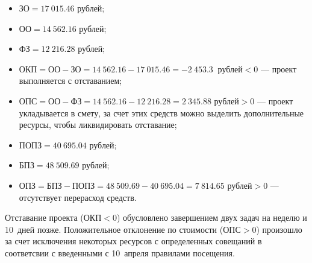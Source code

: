 \begin{itemize}
    \item $\text{ЗО} = 17~015.46$ рублей;
    \item $\text{ОО} = 14~562.16$ рублей;
    \item $\text{ФЗ} = 12~216.28$ рублей;
    \item $\text{ОКП} = \text{ОО} - \text{ЗО} = 14~562.16 - 17~015.46 = -2~453.3~\text{ рублей} < 0$ --- проект выполняется с отставанием;
    \item $\text{ОПС} = \text{ОО} - \text{ФЗ} = 14~562.16 - 12~216.28 = 2~345.88 \text{ рублей} > 0$ --- проект укладывается в смету, за счет этих средств можно выделить дополнительные ресурсы, чтобы ликвидировать отставание;
    \item $\text{ПОПЗ} = 40~695.04$ рублей;
    \item $\text{БПЗ} = 48~509.69$ рублей;
    \item $\text{ОПЗ} = \text{БПЗ} - \text{ПОПЗ} = 48~509.69 - 40~695.04 = 7~814.65 \text{ рублей} > 0$ --- отсутствует перерасход средств.
\end{itemize}

Отставание проекта ($\text{ОКП} < 0$) обусловлено завершением двух задач на неделю и 10~дней позже. Положительное отклонение по стоимости ($\text{ОПС} > 0$) произошло за счет исключения некоторых ресурсов с определенных совещаний в соответсвии с введенными с 10~апреля правилами посещения.